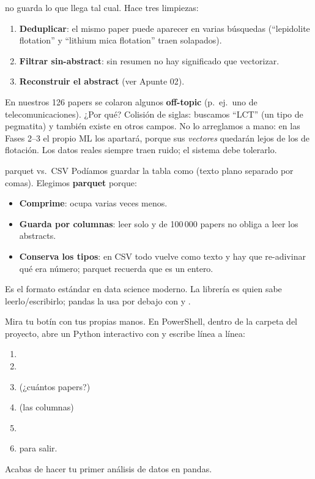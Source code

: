 \documentclass[11pt,a4paper]{article}
\begin{document}
 no guarda lo que llega tal cual. Hace tres limpiezas:
\begin{enumerate}
  \item \textbf{Deduplicar}: el mismo paper puede aparecer en varias búsquedas
        (``lepidolite flotation'' y ``lithium mica flotation'' traen solapados).
  \item \textbf{Filtrar sin-abstract}: sin resumen no hay significado que vectorizar.
  \item \textbf{Reconstruir el abstract} (ver Apunte 02).
\end{enumerate}

\begin{ojo}
En nuestros 126 papers se colaron algunos \textbf{off-topic} (p.\ ej.\ uno de
telecomunicaciones). ¿Por qué? Colisión de siglas: buscamos ``LCT'' (un tipo de pegmatita)
y también existe en otros campos. No lo arreglamos a mano: en las Fases 2--3 el propio ML
los apartará, porque sus \emph{vectores} quedarán lejos de los de flotación. Los datos
reales siempre traen ruido; el sistema debe tolerarlo.
\end{ojo}

\begin{concepto}{parquet vs.\ CSV}
Podíamos guardar la tabla como  (texto plano separado por comas). Elegimos
\textbf{parquet} porque:
\begin{itemize}
  \item \textbf{Comprime}: ocupa varias veces menos.
  \item \textbf{Guarda por columnas}: leer solo  y  de
        100\,000 papers no obliga a leer los abstracts.
  \item \textbf{Conserva los tipos}: en CSV todo vuelve como texto y hay que re-adivinar
        qué era número; parquet recuerda que  es un entero.
\end{itemize}
Es el formato estándar en data science moderno. La librería  es quien
sabe leerlo/escribirlo; pandas la usa por debajo con
 y .
\end{concepto}

\begin{practica}
Mira tu botín con tus propias manos. En PowerShell, dentro de la carpeta del proyecto,
abre un Python interactivo con 
y escribe línea a línea:
\begin{enumerate}
  \item {}
  \item {}
  \item {} \quad (¿cuántos papers?)
  \item {} \quad (las columnas)
  \item {}
  \item {} para salir.
\end{enumerate}
Acabas de hacer tu primer análisis de datos en pandas.
\end{practica}
\end{document}
